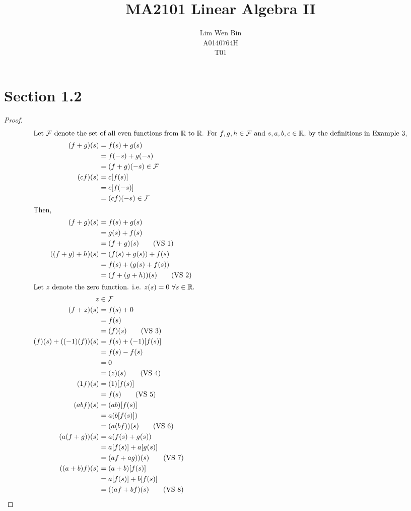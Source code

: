 \documentclass[12pt]{article}
\newenvironment{problem}[2][Problem]{\begin{trivlist}
\item[\hskip \labelsep {\bfseries #1}\hskip \labelsep {\bfseries #2.}]}{\end{trivlist}}
\begin{document}
\title{MA2101 Linear Algebra II}
\author{Lim Wen Bin \\
A0140764H\\
T01}
\maketitle

\section*{Section 1.2}

\begin{problem}{12}
\end{problem}
\begin{proof}
\begin{align*}
\intertext{Let $\mathcal{F}$ denote the set of all even functions 
from $\mathbb{R}$ to $\mathbb{R}$. For $f, g, h \in \mathcal{F}$ and 
$s, a, b, c \in \mathbb{R}$, by the definitions in Example 3,}
(f+g)(s) &= f(s) + g(s) \\
&= f(-s) + g(-s) \\
&= (f+g)(-s) \in \mathcal{F} \\
(cf)(s) &= c[f(s)] \\
&= c[f(-s)] \\
&= (cf)(-s) \in \mathcal{F}\\
\shortintertext{Then,}
(f+g)(s) &= f(s) + g(s)\\
&= g(s) + f(s)\\
&= (f+g)(s) \tag{VS 1} \\
((f+g)+h)(s) &= (f(s) + g(s)) + f(s) \\
&= f(s) + (g(s) + f(s)) \\
&= (f+(g+h))(s) \tag{VS 2} \\
\intertext{Let $z$ denote the zero function. i.e. $z(s) = 0$ 
	$\forall s \in \mathbb{R}$.}
z &\in \mathcal{F} \\
(f+z)(s) &= f(s) + 0 \\
&= f(s) \\
&= (f)(s) \tag{VS 3} \\
(f)(s) + ((-1)(f))(s) &= f(s) + (-1)[f(s)] \\
&= f(s) - f(s) \\
&= 0 \\
&= (z)(s) \tag{VS 4} \\ 
(1f)(s) &= (1)[f(s)] \\
&= f(s)\tag{VS 5} \\
(abf)(s) &= (ab)[f(s)] \\
&= a(b[f(s)]) \\
&= (a(bf))(s) \tag{VS 6} \\
(a(f+g))(s) &= a(f(s) + g(s))\\
&= a[f(s)] + a[g(s)]\\
&= (af+ag))(s) \tag{VS 7} \\
((a+b)f)(s) &= (a+b)[f(s)] \\
&= a[f(s)] + b[f(s)] \\
&= ((af+bf)(s) \tag{VS 8}
\end{align*}
\end{proof}
\filbreak
\end{document}

